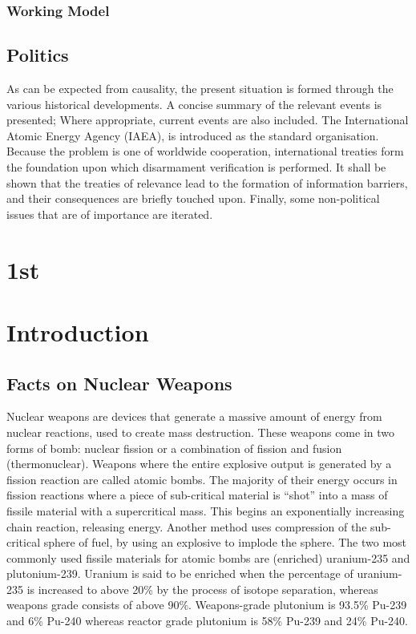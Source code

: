 \documentclass[twoside,titlepage,11pt,twocolumn,a4paper]{article}
\begin{document}
\subsubsection{Working Model}

\subsection{Politics}
As can be expected from causality, the present situation is formed
through the various historical developments. A concise summary of the
relevant events is presented; Where appropriate, current events are
also included. The International Atomic Energy Agency (IAEA), is
introduced as the standard organisation. Because the problem is one of
worldwide cooperation, international treaties form the foundation upon
which disarmament verification is performed. It shall be shown that
the treaties of relevance lead to the formation of information
barriers, and their consequences are briefly touched upon. Finally,
some non-political issues that are of importance are iterated. 



\section{1st}
\section{Introduction}

\subsection{Facts on Nuclear Weapons}
Nuclear weapons are devices that generate a massive amount of energy
from nuclear reactions, used to create mass destruction. These weapons
come in two forms of bomb: nuclear fission or a combination of fission
and fusion (thermonuclear). Weapons where the entire explosive output
is generated by a fission reaction are called atomic bombs. The
majority of their energy occurs in fission reactions where a piece of
sub-critical material is ``shot'' into a mass of fissile material with
a supercritical mass. This begins an exponentially increasing chain
reaction, releasing energy. Another method uses compression of the
sub-critical sphere of fuel, by using an explosive to implode the
sphere. The two most commonly used fissile materials for atomic bombs
are (enriched) uranium-235 and plutonium-239. Uranium is said to be
enriched when the percentage of uranium-235 is increased to above 20\%
by the process of isotope separation, whereas weapons grade consists
of above 90\%. \citep{blackmarket} Weapons-grade plutonium is 93.5\%
Pu-239 and 6\% Pu-240 whereas reactor grade plutonium is 58\% Pu-239
and 24\% Pu-240.  \citep{drell1993}
\end{document}
